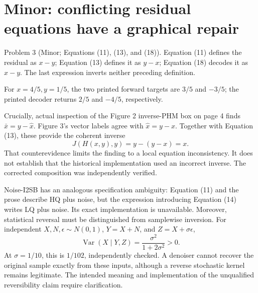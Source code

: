 \documentclass[10pt]{article}
\begin{document}
\section*{Minor: conflicting residual equations have a graphical repair}
Problem 3 (Minor; Equations (11), (13), and (18)).  Equation (11) defines the residual as \(x-y\); Equation (13) defines it as \(y-x\); Equation (18) decodes it as \(\hat x-y\). The last expression inverts neither preceding definition.\par
For \(x=4/5,y=1/5\), the two printed forward targets are \(3/5\) and \(-3/5\); the printed decoder returns \(2/5\) and \(-4/5\), respectively.\par
Crucially, actual inspection of the Figure 2 inverse-PHM box on page 4 finds \(\bar x=y-\hat x\). Figure 3’s vector labels agree with \(\hat x=y-x\). Together with Equation (13), these provide the coherent inverse \[J(H(x,y),y)=y-(y-x)=x.\] That counterevidence limits the finding to a local equation inconsistency. It does not establish that the historical implementation used an incorrect inverse. The corrected composition was independently verified.\par
Noise-I2SB has an analogous specification ambiguity: Equation (11) and the prose describe HQ plus noise, but the expression introducing Equation (14) writes LQ plus noise. Its exact implementation is unavailable. Moreover, statistical reversal must be distinguished from samplewise inversion. For independent \(X,N,\epsilon\sim N(0,1)\), \(Y=X+N\), and \(Z=X+\sigma\epsilon\), \[\operatorname{Var}(X\mid Y,Z)=\frac{\sigma^2}{1+2\sigma^2}>0.\] At \(\sigma=1/10\), this is \(1/102\), independently checked. A denoiser cannot recover the original sample exactly from these inputs, although a reverse stochastic kernel remains legitimate. The intended meaning and implementation of the unqualified reversibility claim require clarification.\par
\end{document}
